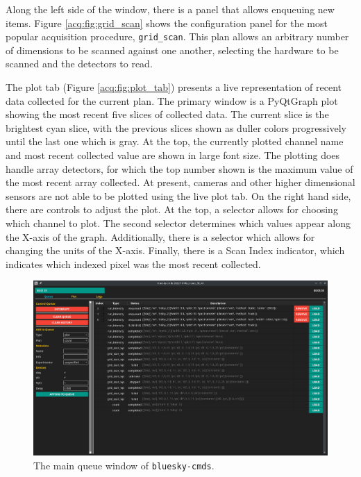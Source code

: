 \documentclass[11pt, full]{article}
\begin{document}
Along the left side of the window, there is a panel that allows enqueuing new items.
Figure \ref{acq:fig:grid_scan} shows the configuration panel for the most popular acquisition procedure, \texttt{grid\_scan}.
This plan allows an arbitrary number of dimensions to be scanned against one another, selecting the hardware to be scanned and the detectors to read.

The plot tab (Figure \ref{acq:fig:plot_tab}) presents a live representation of recent data collected for the current plan.
The primary window is a PyQtGraph \cite{pyqtgraph} plot showing the most recent five slices of collected data.
The current slice is the brightest cyan slice, with the previous slices shown as duller colors progressively until the last one which is gray.
At the top, the currently plotted channel name and most recent collected value are shown in large font size.
The plotting does handle array detectors, for which the top number shown is the maximum value of the most recent array collected.
At present, cameras and other higher dimensional sensors are not able to be plotted using the live plot tab.
On the right hand side, there are controls to adjust the plot.
At the top, a selector allows for choosing which channel to plot.
The second selector determines which values appear along the X-axis of the graph.
Additionally, there is a selector which allows for changing the units of the X-axis.
Finally, there is a Scan Index indicator, which indicates which indexed pixel was the most recent collected.

\clearpage

\begin{landscape}
\begin{figure}
\includegraphics[width=9in]{"figures/queue_tab.png"}
	\caption{The main queue window of \texttt{bluesky-cmds}.}
\label{acq:fig:queue_tab}
\end{figure}
\end{landscape}
\end{document}
